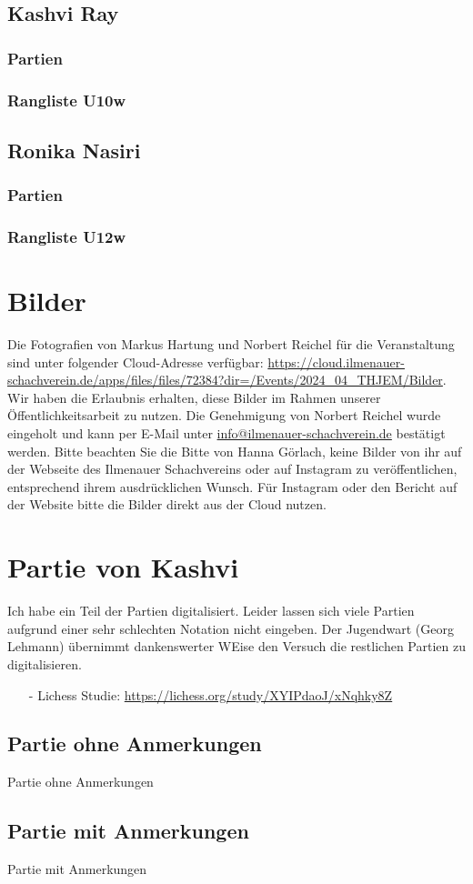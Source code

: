 \documentclass[a4paper,ngerman]{tui-algo-seminar}
\begin{document}
\subsection{Kashvi Ray}
    \subsubsection{Partien}
        
    \subsubsection{Rangliste U10w}
        
\clearpage

\subsection{Ronika Nasiri}
    \subsubsection{Partien}
        
    \subsubsection{Rangliste U12w}
        
    
\clearpage


\section{Bilder}
Die Fotografien von Markus Hartung und Norbert Reichel für die Veranstaltung sind unter folgender Cloud-Adresse verfügbar: \url{https://cloud.ilmenauer-schachverein.de/apps/files/files/72384?dir=/Events/2024_04_THJEM/Bilder}. Wir haben die Erlaubnis erhalten, diese Bilder im Rahmen unserer Öffentlichkeitsarbeit zu nutzen. Die Genehmigung von Norbert Reichel wurde eingeholt und kann per E-Mail unter \href{mailto:info@ilmenauer-schachverein.de}{info@ilmenauer-schachverein.de} bestätigt werden.
Bitte beachten Sie die Bitte von Hanna Görlach, keine Bilder von ihr auf der Webseite des Ilmenauer Schachvereins oder auf Instagram zu veröffentlichen, entsprechend ihrem ausdrücklichen Wunsch. Für Instagram oder den Bericht auf der Website bitte die Bilder direkt aus der Cloud nutzen.




\clearpage
\section{Partie von Kashvi}
Ich habe ein Teil der Partien digitalisiert. Leider lassen sich viele Partien aufgrund einer sehr schlechten Notation nicht eingeben. Der Jugendwart (Georg Lehmann) übernimmt dankenswerter WEise den Versuch die restlichen Partien zu digitalisieren.
\begin{itemize}
    \item[-] Lichess Studie: \url{https://lichess.org/study/XYIPdaoJ/xNqhky8Z}
\end{itemize}


\subsection{Partie ohne Anmerkungen}
Partie ohne Anmerkungen
\subsection{Partie mit Anmerkungen}

Partie mit Anmerkungen
\end{document}
